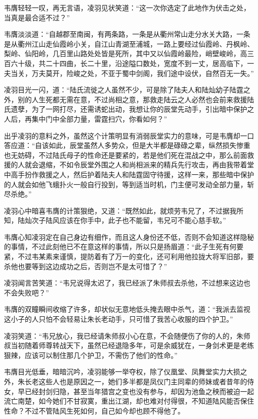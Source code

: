 韦膺轻轻一叹，再无言语，凌羽见状笑道：“这一次你选定了此地作为伏击之处，当真是最合适不过？”

韦膺淡淡道：“自越郡至南闽，有两条路，一条是从衢州常山走分水关大路，一条是从衢州江山走仙霞岭小关，自江山青湖至浦城，一路上要经过仙霞岭、丹枫岭、梨岭、仙阳岭，几百里山路处处皆是死所，其中又以仙霞岭最险，峭壁峻岭，高三百六十级，共二十四曲，长二十里，沿途隘口数处，宽度不到一丈，居高临下，一夫当关，万夫莫开，险峻之处，不亚于蜀中剑阁，我们途中设伏，自然百无一失。”

凌羽目光一闪，道：“陆氏流徙之人虽然不少，可是除了陆夫人和陆灿幼子陆霆之外，别的人生死都无需在意，不过尚相之意，那救走陆云之人必然也会前来救援陆氏遗孽，为了一网打尽，还需诱蛇出动，我想让你的辰堂先动手，引出暗中保护之人后，再集中门中全部力量，雷霆扫穴，你看如何？”

出乎凌羽的意料之外，虽然这个计策明显有消弱辰堂实力的意味，可是韦膺却一口答应道：“自该如此，辰堂虽然人多势众，但是大半都是碌碌之辈，纵然损失惨重也无妨碍，不过陆氏母子的性命还是要紧的，若是他们死在混战之中，那么前面救援的人就会退缩，不如令辰堂外围之人和尚相派来的精兵先行攻击，再由我带着堂中高手扮作救援之人，然后护着陆夫人和陆霆固守待援，这样一来，那些暗中保护的人就会如他飞蛾扑火一般自行投到，等到适当时机，门主便可发动全部力量，斩尽杀绝。”

凌羽心中暗喜韦膺的计策狠绝，又道：“既然如此，就烦劳韦兄了，不过据我所知，陆灿次子陆风应该在你手中，此子也不能留，韦兄可不能心慈手软。”

韦膺心知凌羽定在自己身边有细作，而且这人身份还不低，否则不会知道这样隐秘的事情，不过此刻他已不在意这样的事情，所以只是扬眉道：“此子生死有何要紧，不过韦某素来谨慎，提防着有了万一的变化，还可利用他拉拢大将军旧部，要杀他也要等到这边成功之后，否则岂不是太可惜了？”

凌羽闻言苦笑道：“韦兄说得太迟了，我已经派了朱师叔去杀他，不过想来这边也不会失败吧？”

韦膺的双瞳瞬间收缩了许多，却状似无意地低头掩去眼中杀气，道：“我派去监视这小子的人只怕不会轻易让朱长老动手，只可惜了我苦心收服的四个护卫。”

凌羽笑道：“韦兄放心，我已经请朱师叔小心在意，不会随便伤了你的人的，朱师叔当初随着师尊转战天下，虽然已经退隐多年，可是余威犹在，一身剑术更是老练狠辣，应该可以制住那几个护卫，不需伤了他们的性命。”

韦膺目光低垂，暗暗沉吟，凌羽能够一举夺权，除了仪凰堂、凤舞堂实力大损之外，朱长老这些人也是原因之一，她们多半都是凤仪门主同辈的师妹或者昔年的侍女，早已经封剑归隐，甚至当年猎宫之变也没有参与，却因为池鱼之秧而被迫一起流亡南楚，如今她们不甘寂寞，重出江湖，却也难对付得很，不知道陆风能否保住性命？不过不管陆风生死如何，自己如今却也顾不得他了。

